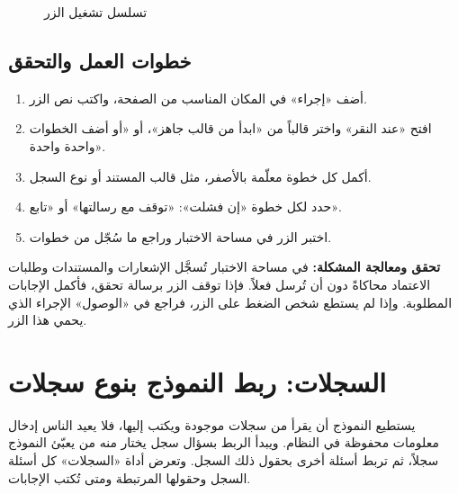 \begin{figure}[H]
\centering
{}
\rclegend
\caption{تسلسل تشغيل الزر}
\label{fig:builder-forms-buttons-flow}
\end{figure}

\subsection{خطوات العمل والتحقق}
\begin{enumerate}
\item أضف «إجراء» في المكان المناسب من الصفحة، واكتب نص الزر.
\item افتح «عند النقر» واختر قالباً من «ابدأ من قالب جاهز»، أو «أو أضف الخطوات واحدة واحدة».
\item أكمل كل خطوة معلّمة بالأصفر، مثل قالب المستند أو نوع السجل.
\item حدد لكل خطوة «إن فشلت»: «توقف مع رسالتها» أو «تابع».
\item اختبر الزر في مساحة الاختبار وراجع ما سُجّل من خطوات.
\end{enumerate}

\textbf{تحقق ومعالجة المشكلة:} في مساحة الاختبار تُسجَّل الإشعارات والمستندات وطلبات الاعتماد محاكاةً دون أن تُرسل فعلاً. فإذا توقف الزر برسالة تحقق، فأكمل الإجابات المطلوبة. وإذا لم يستطع شخص الضغط على الزر، فراجع في «الوصول» الإجراء الذي يحمي هذا الزر.

\clearpage
\section{السجلات: ربط النموذج بنوع سجلات}
\label{sec:builder-feature-forms-records}

يستطيع النموذج أن يقرأ من سجلات موجودة ويكتب إليها، فلا يعيد الناس إدخال معلومات محفوظة في النظام. ويبدأ الربط بسؤال سجل يختار منه من يعبّئ النموذج سجلاً، ثم تربط أسئلة أخرى بحقول ذلك السجل. وتعرض أداة «السجلات» كل أسئلة السجل وحقولها المرتبطة ومتى تُكتب الإجابات.

